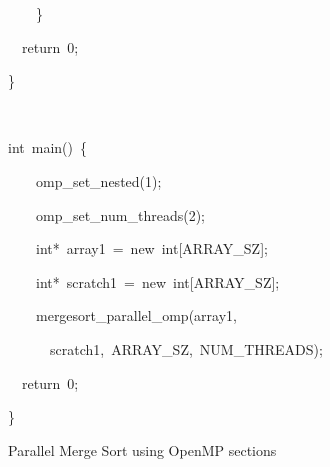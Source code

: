 \documentclass[copyright,creativecommons]{eptcs}
\newenvironment{lyxcode}
{\par\begin{list}{}{
\setlength{\rightmargin}{\leftmargin}
\setlength{\listparindent}{0pt}\raggedright
\setlength{\itemsep}{0pt}
\setlength{\parsep}{0pt}
\normalfont\ttfamily}\item[]}
{\end{list}}
\begin{document}
\begin{lyxcode}
\begin{algorithm}[H]
\begin{lyxcode}
{\small{}~~~~\}}{\small \par}

{\small{}~~return~0;~}{\small \par}

{\small \}}{\small \par}

{\small{}~}{\small \par}

{\small int~main()~\{}{\small \par}

{\small{}~~~~omp\_set\_nested(1);}{\small \par}

{\small{}~~~~omp\_set\_num\_threads(2);}{\small \par}

{\small{}~~~~int{*}~array1~=~new~int{[}ARRAY\_SZ{]};}{\small \par}

{\small{}~~~~int{*}~scratch1~=~new~int{[}ARRAY\_SZ{]};}{\small \par}

{\small{}~~~~mergesort\_parallel\_omp(array1,~}{\small \par}

{\small{}~~~~~~scratch1,~ARRAY\_SZ,~NUM\_THREADS);}{\small \par}

{\small{}~~return~0;}{\small \par}

{\small \}}{\small \par}

\medskip{}

\end{lyxcode}
{\small \caption{Parallel Merge Sort using OpenMP sections \cite{radenskishared}}
}
\end{algorithm}
{\small \par}

\end{lyxcode}
\end{document}
